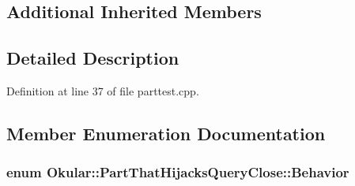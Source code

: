 \subsection*{Additional Inherited Members}


\subsection{Detailed Description}


Definition at line 37 of file parttest.\+cpp.



\subsection{Member Enumeration Documentation}
\hypertarget{classOkular_1_1PartThatHijacksQueryClose_a0ea34ea89c435d138fc9dae84723cf27}{
\subsubsection[{Behavior}]{\setlength{\rightskip}{0pt plus 5cm}enum {\bf Okular\+::\+Part\+That\+Hijacks\+Query\+Close\+::\+Behavior}}}\label{classOkular_1_1PartThatHijacksQueryClose_a0ea34ea89c435d138fc9dae84723cf27}
